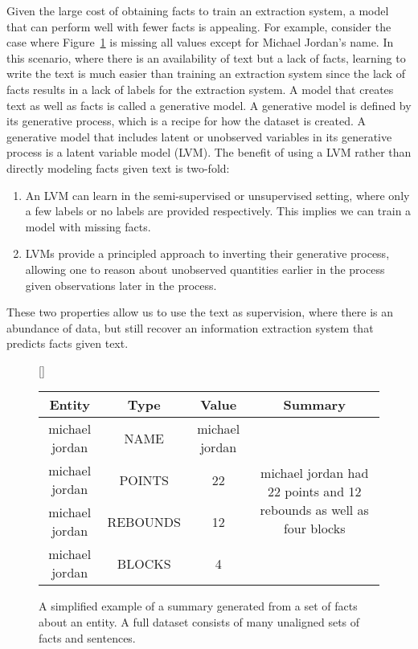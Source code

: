 \documentclass[12pt]{article}
\begin{document}
Given the large cost of obtaining facts to train an extraction system,
a model that can perform well with fewer facts is appealing.
For example, consider the case where Figure~\ref{fig:boxscore} is missing all values except for 
Michael Jordan's name.
In this scenario, where there is an availability of text but a lack of facts,
learning to write the text is much easier than training an extraction system
since the lack of facts results in a lack of labels for the extraction system.
A model that creates text as well as facts is called a generative model.
A generative model is defined by its generative process, which 
is a recipe for how the dataset is created.
A generative model that includes latent or unobserved variables in its generative process
is a latent variable model (LVM).
The benefit of using a LVM rather than directly modeling facts given text is two-fold:
\begin{enumerate}
\item An LVM can learn in the semi-supervised or unsupervised setting,
where only a few labels or no labels are provided respectively.
This implies we can train a model with missing facts.
\item LVMs provide a principled approach to inverting their generative process,
allowing one to reason about unobserved quantities earlier in the process given
observations later in the process. 
\end{enumerate}
These two properties allow us to use the text as supervision,
where there is an abundance of data, but still recover an information extraction system that predicts facts
given text.

\begin{figure}[t]
\centering
{}[\FBwidth]
{\caption{A simplified example of a summary generated from a set of facts about an entity.
A full dataset consists of many unaligned sets of facts and sentences.}
\label{fig:boxscore}}
{\small\begin{tabular}{ccc|c}
\toprule
Entity & Type & Value & Summary\\
\midrule
michael jordan & NAME & michael jordan &
\multirow{4}{*}{\parbox{4cm}{michael jordan had 22 points and 12 rebounds as well as four blocks}}\\
michael jordan & POINTS & 22 &\\
michael jordan & REBOUNDS & 12 & \\
michael jordan & BLOCKS & 4 &\\
\bottomrule
\end{tabular}}
\end{figure}
\end{document}
